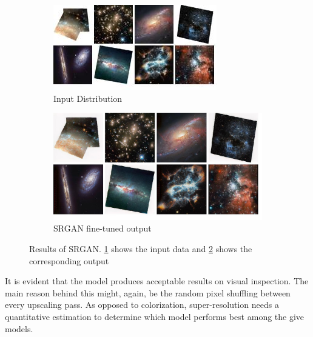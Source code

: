\documentclass[10pt,twocolumn,letterpaper]{article}
\begin{document}
    \begin{figure}[!htb]
    	\centering
    	\begin{subfigure}[b]{0.35\textwidth}
    		\centering
    		\includegraphics[width=\textwidth]{figures/inputsamples_superR}
    		\caption{Input Distribution}
    		\label{fig: sr_input_samples}
    	\end{subfigure}
    	\begin{subfigure}[b]{0.35\textwidth}
    		\centering
    		\includegraphics[width=\textwidth]{figures/samples_SRGAN}
    		\caption{SRGAN fine-tuned output}
    		\label{fig: sr__outputs}
    	\end{subfigure}
    	\caption{Results of SRGAN. \cref{fig: sr_input_samples} shows the input data and \cref{fig: sr__outputs} shows the corresponding output}
    	\label{fig: sr_comparisons}
    \end{figure}
    It is evident that the model produces acceptable results on visual inspection. The main reason behind this might, again, be the random pixel shuffling between every upscaling pass. 
    As opposed to colorization, super-resolution needs a quantitative estimation to determine which model performs best among the give models. 
    
\end{document}
